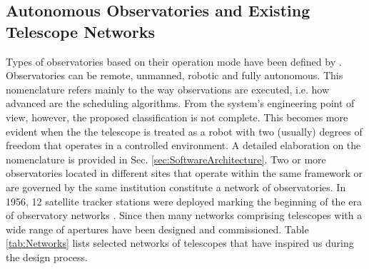 \subsection{Autonomous Observatories and Existing Telescope Networks}
\label{ssec:ExistingNetworks}

Types of observatories based on their operation mode have been defined by \cite{Gelderman2001}. Observatories can be remote, unmanned, robotic and fully autonomous. This nomenclature refers mainly to the way observations are executed, i.e. how advanced are the scheduling algorithms. From the system's engineering point of view, however, the proposed classification is not complete. This becomes more evident when the the telescope is treated as a robot with two (usually) degrees of freedom that operates in a controlled environment. A detailed elaboration on the nomenclature is provided in Sec. \ref{sec:SoftwareArchitecture}. Two or more observatories located in different sites that operate within the same framework or are governed by the same institution constitute a network of observatories. In 1956, 12 satellite tracker stations were deployed marking the beginning of the era of observatory networks  \citep{Whipple1956}. Since then many networks comprising telescopes with a wide range of apertures have been designed and commissioned. Table \ref{tab:Networks} lists selected networks of telescopes that have inspired us during the design process. 

